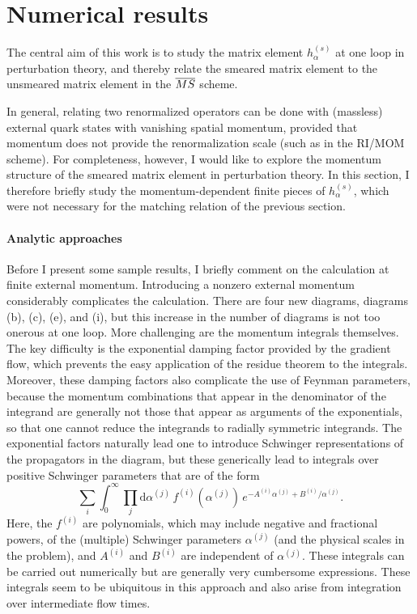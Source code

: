 \section{\label{sec:numres}Numerical results}

The central aim of this work is to study the matrix element $h_\alpha^{(s)}$ at one loop in perturbation theory, and thereby relate the smeared matrix element to the unsmeared matrix element in the $\overline{MS}$ scheme.

In general, relating two renormalized operators can be done with (massless) external quark states with vanishing spatial momentum, provided that momentum does not provide the renormalization scale (such as in the RI/MOM scheme). For completeness, however, I would like to explore the momentum structure of the smeared matrix element in perturbation theory. In this section, I therefore briefly study the momentum-dependent finite pieces of $h_\alpha^{(s)}$, which were not necessary for the matching relation of the previous section.

\paragraph{Analytic approaches} Before I present some sample results, I briefly comment on the calculation at finite external momentum. Introducing a nonzero external momentum considerably complicates the calculation. There are four new diagrams, diagrams (b), (c), (e), and (i), but this increase in the number of diagrams is not too onerous at one loop. More challenging are the momentum integrals themselves. The key difficulty is the exponential damping factor provided by the gradient flow, which prevents the easy application of the residue theorem to the integrals. Moreover, these damping factors also complicate the use of Feynman parameters, because the momentum combinations that appear in the denominator of the integrand are generally not those that appear as arguments of the exponentials, so that one cannot reduce the integrands to radially symmetric integrands. The exponential factors naturally lead one to introduce Schwinger representations of the propagators in the diagram, but these generically lead to integrals over positive Schwinger parameters that are of the form
\begin{equation}
\sum_i\int_0^\infty \prod_j\mathrm{d}\alpha^{(j)}\,f^{(i)}\left(\alpha^{(j)}\right)\,e^{-A^{(i)}\alpha^{(j)}+B^{(i)}/\alpha^{(j)}}.
\end{equation}
Here, the $f^{(i)}$ are polynomials, which may include negative and fractional powers, of the (multiple) Schwinger parameters $\alpha^{(j)}$ (and the physical scales in the problem), and $A^{(i)}$ and $B^{(i)}$ are independent of $\alpha^{(j)}$. These integrals can be carried out numerically but are generally very cumbersome expressions. These integrals seem to be ubiquitous in this approach and also arise from integration over intermediate flow times.

